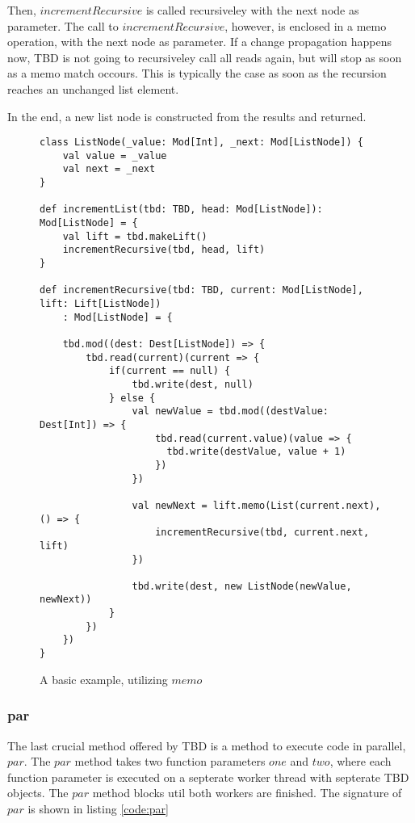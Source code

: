 Then, $incrementRecursive$ is called recursiveley with the next node as parameter. The call to $incrementRecursive$, however, is enclosed in a memo operation, with the next node as parameter. If a change propagation happens now, TBD is not going to recursiveley call all reads again, but will stop as soon as a memo match occours. This is typically the case as soon as the recursion reaches an unchanged list element. 

In the end, a new list node is constructed from the results and returned. 
\begin{figure*}
\begin{lstlisting}[frame=single,basicstyle=\ttfamily]
class ListNode(_value: Mod[Int], _next: Mod[ListNode]) {
    val value = _value
    val next = _next
}

def incrementList(tbd: TBD, head: Mod[ListNode]): Mod[ListNode] = {
    val lift = tbd.makeLift()
    incrementRecursive(tbd, head, lift)
}

def incrementRecursive(tbd: TBD, current: Mod[ListNode], lift: Lift[ListNode])
    : Mod[ListNode] = {

    tbd.mod((dest: Dest[ListNode]) => {
        tbd.read(current)(current => {
            if(current == null) {
                tbd.write(dest, null)
            } else {
                val newValue = tbd.mod((destValue: Dest[Int]) => {
                    tbd.read(current.value)(value => {
                      tbd.write(destValue, value + 1)
                    })
                })

                val newNext = lift.memo(List(current.next), () => {
                    incrementRecursive(tbd, current.next, lift)
                })

                tbd.write(dest, new ListNode(newValue, newNext))
            } 
        })
    })
}

\end{lstlisting}
\caption{A basic example, utilizing $memo$}
\label{code:memoExample}
\end{figure*}

\subsubsection{par}
The last crucial method offered by TBD is a method to execute code in parallel, $par$. The $par$ method takes two function parameters $one$ and $two$, where each function parameter is executed on a septerate worker thread with septerate TBD objects. The $par$ method blocks util both workers are finished. The signature of $par$ is shown in listing \ref{code:par}

